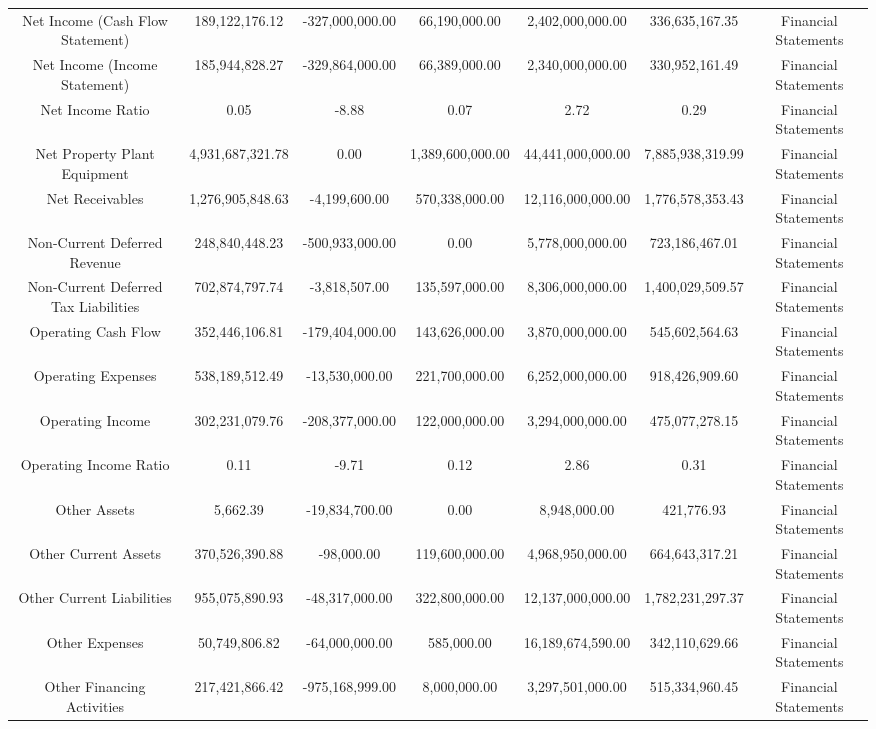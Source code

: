 \begin{longtable}{ccccccc}
Net Income (Cash Flow Statement) & 189,122,176.12 & -327,000,000.00 & 66,190,000.00 & 2,402,000,000.00 & 336,635,167.35 & Financial Statements \\
Net Income (Income Statement) & 185,944,828.27 & -329,864,000.00 & 66,389,000.00 & 2,340,000,000.00 & 330,952,161.49 & Financial Statements \\
Net Income Ratio & 0.05 & -8.88 & 0.07 & 2.72 & 0.29 & Financial Statements \\
Net Property Plant Equipment & 4,931,687,321.78 & 0.00 & 1,389,600,000.00 & 44,441,000,000.00 & 7,885,938,319.99 & Financial Statements \\
Net Receivables & 1,276,905,848.63 & -4,199,600.00 & 570,338,000.00 & 12,116,000,000.00 & 1,776,578,353.43 & Financial Statements \\
Non-Current Deferred Revenue & 248,840,448.23 & -500,933,000.00 & 0.00 & 5,778,000,000.00 & 723,186,467.01 & Financial Statements \\
Non-Current Deferred Tax Liabilities & 702,874,797.74 & -3,818,507.00 & 135,597,000.00 & 8,306,000,000.00 & 1,400,029,509.57 & Financial Statements \\
Operating Cash Flow & 352,446,106.81 & -179,404,000.00 & 143,626,000.00 & 3,870,000,000.00 & 545,602,564.63 & Financial Statements \\
Operating Expenses & 538,189,512.49 & -13,530,000.00 & 221,700,000.00 & 6,252,000,000.00 & 918,426,909.60 & Financial Statements \\
Operating Income & 302,231,079.76 & -208,377,000.00 & 122,000,000.00 & 3,294,000,000.00 & 475,077,278.15 & Financial Statements \\
Operating Income Ratio & 0.11 & -9.71 & 0.12 & 2.86 & 0.31 & Financial Statements \\
Other Assets & 5,662.39 & -19,834,700.00 & 0.00 & 8,948,000.00 & 421,776.93 & Financial Statements \\
Other Current Assets & 370,526,390.88 & -98,000.00 & 119,600,000.00 & 4,968,950,000.00 & 664,643,317.21 & Financial Statements \\
Other Current Liabilities & 955,075,890.93 & -48,317,000.00 & 322,800,000.00 & 12,137,000,000.00 & 1,782,231,297.37 & Financial Statements \\
Other Expenses & 50,749,806.82 & -64,000,000.00 & 585,000.00 & 16,189,674,590.00 & 342,110,629.66 & Financial Statements \\
Other Financing Activities & 217,421,866.42 & -975,168,999.00 & 8,000,000.00 & 3,297,501,000.00 & 515,334,960.45 & Financial Statements \\

\end{longtable}
